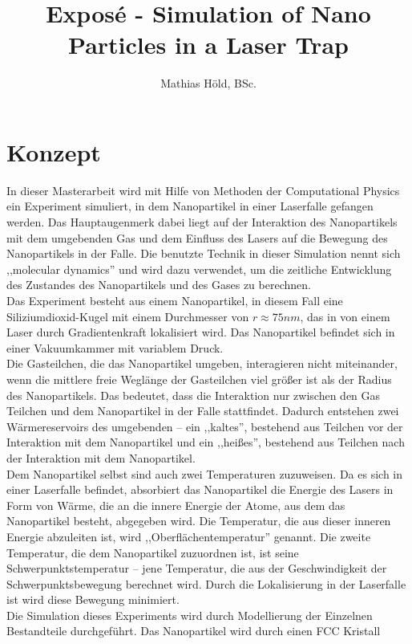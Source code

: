 \documentclass[12pt]{article}
\begin{document}
\title{Expos\'e - Simulation of Nano Particles in a Laser Trap}
\author{Mathias H\"old, BSc.}
\maketitle
\thispagestyle{empty}
\section{Konzept}
In dieser Masterarbeit wird mit Hilfe von Methoden der Computational Physics ein Experiment simuliert, in dem Nanopartikel in einer Laserfalle
gefangen werden. Das Hauptaugenmerk dabei liegt auf der Interaktion des Nanopartikels mit dem umgebenden Gas und dem Einfluss des Lasers auf die
Bewegung des Nanopartikels in der Falle. Die benutzte Technik in dieser Simulation nennt sich ,,molecular dynamics'' 
und wird dazu verwendet, um die zeitliche Entwicklung des Zustandes des Nanopartikels und des Gases zu berechnen.\\
Das Experiment besteht aus einem Nanopartikel, in diesem Fall eine Siliziumdioxid-Kugel mit einem Durchmesser von $r \approx 75 nm$, das in von einem
Laser durch Gradientenkraft lokalisiert wird. Das Nanopartikel befindet sich in einer Vakuumkammer mit variablem Druck.\\
Die Gasteilchen, die das Nanopartikel umgeben, interagieren nicht miteinander, wenn die mittlere freie Wegl\"ange der Gasteilchen viel gr\"o\ss er ist
als der Radius des Nanopartikels. Das bedeutet, dass die Interaktion nur zwischen den Gas Teilchen und dem Nanopartikel in der Falle stattfindet. 
Dadurch entstehen zwei W\"armereservoirs des umgebenden -- ein ,,kaltes'', bestehend aus Teilchen vor der Interaktion mit dem Nanopartikel und ein
,,hei\ss es'', bestehend aus Teilchen nach der Interaktion mit dem Nanopartikel.\\
Dem Nanopartikel selbst sind auch zwei Temperaturen zuzuweisen. Da es sich in einer Laserfalle befindet, absorbiert das Nanopartikel die Energie des
Lasers in Form von W\"arme, die an die innere Energie der Atome, aus dem das Nanopartikel besteht, abgegeben wird. Die Temperatur, die aus dieser
inneren Energie abzuleiten ist, wird ,,Oberfl\"achentemperatur'' genannt. Die zweite Temperatur, die dem Nanopartikel zuzuordnen ist, ist seine
Schwerpunktstemperatur -- jene Temperatur, die aus der Geschwindigkeit der Schwerpunktsbewegung berechnet wird. Durch die Lokalisierung in der
Laserfalle ist wird diese Bewegung minimiert. \\
Die Simulation dieses Experiments wird durch Modellierung der Einzelnen Bestandteile durchgef\"uhrt. Das Nanopartikel wird durch einen FCC Kristall
\end{document}
